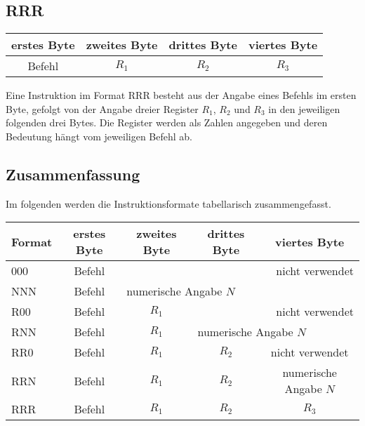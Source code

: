 \subsection{RRR}
\label{RRR}

\begin{center}
  \begin{tabular}{|*{4}{c|}} \hline
    erstes Byte & zweites Byte  & drittes Byte  & viertes Byte \\\hline\hline
    Befehl      & $R_{1}$       & $R_{2}$       & $R_{3}$      \\\hline
  \end{tabular}
\end{center}

Eine Instruktion im Format RRR besteht aus der Angabe eines Befehls im ersten
Byte, gefolgt von der Angabe dreier Register $R_{1}$, $R_{2}$ und $R_{3}$ in den
jeweiligen folgenden drei Bytes.
Die Register werden als Zahlen angegeben und deren Bedeutung hängt vom
jeweiligen Befehl ab.


\subsection{Zusammenfassung}
\label{subsec:Instr-Formate-Zusammenfassung}
Im folgenden werden die Instruktionsformate tabellarisch zusammengefasst.

\begin{center}
  \begin{tabular}{|l||*{4}{c|}}
    \hline
    Format & erstes Byte & zweites Byte  & drittes Byte  & viertes Byte
    \\\hline\hline
    000 & Befehl & \multicolumn{3}{r|}{nicht verwendet}                 \\\hline
    NNN & Befehl & \multicolumn{3}{l|}{numerische Angabe $N$}           \\\hline
    R00 & Befehl & $R_{1}$ & \multicolumn{2}{r|}{nicht verwendet}       \\\hline
    RNN & Befehl & $R_{1}$ & \multicolumn{2}{l|}{numerische Angabe $N$} \\\hline
    RR0 & Befehl & $R_{1}$ & $R_{2}$ &  nicht verwendet                 \\\hline
    RRN & Befehl & $R_{1}$ & $R_{2}$ & numerische Angabe $N$            \\\hline
    RRR & Befehl & $R_{1}$ & $R_{2}$ & $R_{3}$                          \\\hline
  \end{tabular}
\end{center}



